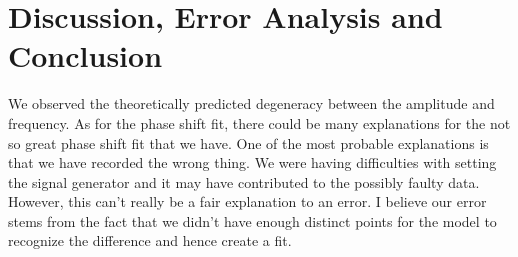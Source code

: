 \documentclass[twocolumn]{article}\usepackage[english]{babel}
\begin{document}
\section{Discussion, Error Analysis and Conclusion}
We observed the theoretically predicted degeneracy between the amplitude and frequency. As for the phase shift fit, there could be many explanations for the not so great phase shift fit that we have. One of the most probable explanations is that we have recorded the wrong thing. We were having difficulties with setting the signal generator and it may have contributed to the possibly faulty data. However, this can't really be a fair explanation to an error. I believe our error stems from the fact that we didn't have enough distinct points for the model to recognize the difference and hence create a fit.

\medskip

\printbibliography
\end{document}
